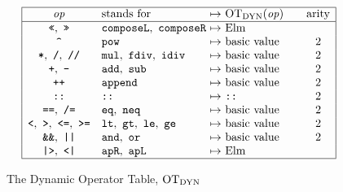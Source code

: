 \begin{figure}[htbp]
\centering
\small
\[
\begin{array}{|c@{\quad}l@{\ }c@{\ }l@{\qquad}c|}
\hline
\opv & \text{stands for} & \mapsto & \OTdyn(\opv) & \arity\\
\hline
\kw{<<},\ \kw{>>} & \kw{composeL}\citealso{b:Basics.composeL},\ \kw{composeR}\citealso{b:Basics.composeR} & \mapsto & \text{Elm} & \\
\kw{\textasciicircum} & \kw{pow}\citealso{b:Basics.pow} & \mapsto & \text{basic value} & 2\\
\kw{*},\ \kw{/},\ \kw{//} & \kw{mul}\citealso{b:Basics.mul},\ \kw{fdiv}\citealso{b:Basics.fdiv},\ \kw{idiv}\citealso{b:Basics.idiv} & \mapsto & \text{basic value} & 2\\
\kw{+},\ \kw{-} & \kw{add}\citealso{b:Basics.add},\ \kw{sub}\citealso{b:Basics.sub} & \mapsto & \text{basic value} & 2\\
\kw{++} & \kw{append}\citealso{b:Basics.append} & \mapsto & \text{basic value} & 2\\
\kw{::} & \kw{::}\citealso{b:List} & \mapsto & \kw{::} & 2\\
\kw{==},\ \kw{/=} & \kw{eq}\citealso{b:Basics.eq},\ \kw{neq}\citealso{b:Basics.neq} & \mapsto & \text{basic value} & 2\\
\kw{<},\ \kw{>},\ \kw{<=},\ \kw{>=} & \kw{lt}\citealso{b:Basics.lt},\ \kw{gt}\citealso{b:Basics.gt},\ \kw{le}\citealso{b:Basics.le},\ \kw{ge}\citealso{b:Basics.ge} & \mapsto & \text{basic value} & 2\\
\kw{\&\&},\ \kw{||} & \kw{and}\citealso{b:Basics.and},\ \kw{or}\citealso{b:Basics.or} & \mapsto & \text{basic value} & 2\\
\kw{|>},\ \kw{<|} & \kw{apR}\citealso{b:Basics.apR},\ \kw{apL}\citealso{b:Basics.apL} & \mapsto & \text{Elm} & \\
\hline
\end{array}
\]
\caption{The Dynamic Operator Table, $\mathrm{OT}_{\mathrm{DYN}}$}\label{fig:dynamic-basis-operators}
\end{figure}

